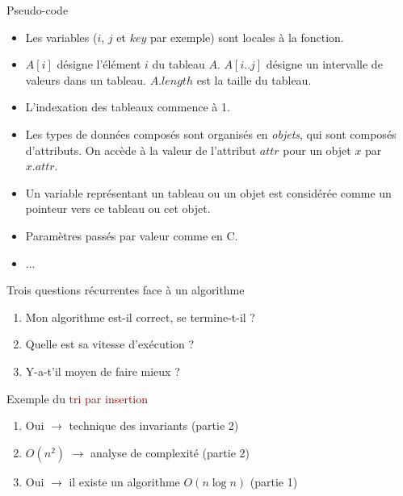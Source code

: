 \begin{frame}{Pseudo-code}

\begin{itemize}
\item Les variables ($i$, $j$ et $key$ par exemple) sont locales à la fonction.
\item $A[i]$ désigne l'élément $i$ du tableau $A$. $A[i..j]$ désigne
  un intervalle de valeurs dans un tableau. $A.length$ est la taille du tableau.
\item L'indexation des tableaux commence à 1.
\item Les types de données composés sont organisés en {\it objets}, qui sont composés d'attributs. On accède à la valeur de l'attribut $attr$ pour un objet $x$ par $x.attr$.
\item Un variable représentant un tableau ou un objet est considérée comme un pointeur vers ce tableau ou cet objet. 
\item Paramètres passés par valeur comme en C.
\item ...
\end{itemize}
\end{frame}

\begin{frame}{Trois questions récurrentes face à un algorithme}

\begin{enumerate}
\item Mon algorithme est-il correct, se termine-t-il ? %

\bigskip

\item Quelle est sa vitesse d'exécution ? %

\bigskip

\item Y-a-t'il moyen de faire mieux ? %

\end{enumerate}

\bigskip

Exemple du \textcolor{darkred}{tri par insertion}
\begin{enumerate}
\item Oui $\rightarrow$ technique des invariants (partie 2)
\item $O(n^2)$ $\rightarrow$ analyse de complexité (partie 2)
\item Oui $\rightarrow$ il existe un algorithme $O(n\log n)$ (partie 1)
\end{enumerate}

\end{frame}

